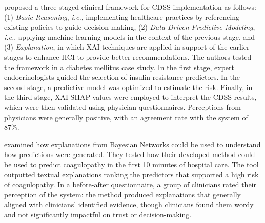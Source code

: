 \cite{kovalchuk2022three} proposed a three-staged clinical framework for CDSS implementation as follows: (1) \textit{Basic Reasoning}, \textit{i.e.}, implementing healthcare practices by referencing existing policies to guide decision-making, (2) \textit{Data-Driven Predictive Modeling}, \textit{i.e.}, applying machine learning models in the context of the previous stage, and (3) \textit{Explanation}, in which XAI techniques are applied in support of the earlier stages to enhance HCI to provide better recommendations. 
The authors tested the framework in a diabetes mellitus case study. In the first stage, expert endocrinologists guided the selection of insulin resistance predictors. In the second stage, a predictive model was optimized to estimate the risk. Finally, in the third stage, XAI SHAP values were employed to interpret the CDSS results, which were then validated using physician questionnaires. Perceptions from physicians were generally positive, with an agreement rate with the system of 87\%. 




\cite{kyrimi2020incremental} examined how explanations from Bayesian Networks could be used to understand how predictions were generated. They tested how their developed method could be used to predict coagulopathy in the first 10 minutes of hospital care. The tool outputted textual explanations ranking the predictors that supported a high risk of coagulopathy. In a before-after questionnaire, a group of clinicians rated their perception of the system: the method produced explanations that generally aligned with clinicians' identified evidence, though clinicians found them wordy and not significantly impactful on trust or decision-making.




